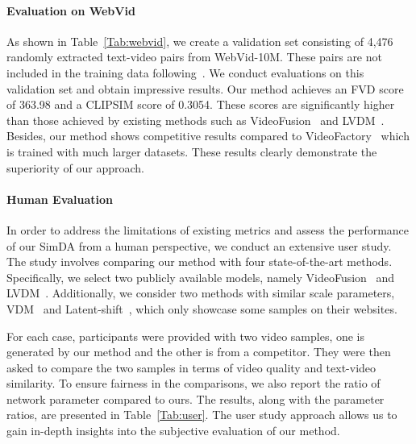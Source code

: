 \paragraph{Evaluation on WebVid}
As shown in Table~\ref{Tab:webvid}, we create a validation set consisting of 4,476 randomly extracted text-video pairs from WebVid-10M. These pairs are not included in the training data following~\cite{videofactory}. We conduct evaluations on this validation set and obtain impressive results. Our method achieves an FVD score of 363.98 and a CLIPSIM score of 0.3054. These scores are significantly higher than those achieved by existing methods such as VideoFusion~\cite{videofusion} and LVDM~\cite{lvdm}. Besides, our method shows competitive results compared to VideoFactory~\cite{videofactory} which is trained with much larger datasets. These results clearly demonstrate the superiority of our approach.

\paragraph{Human Evaluation}
In order to address the limitations of existing metrics and assess the performance of our SimDA from a human perspective, we conduct an extensive user study. The study involves comparing our method with four state-of-the-art methods. Specifically, we select two publicly available models, namely VideoFusion~\cite{videofusion} and LVDM~\cite{lvdm}. Additionally, we consider two methods with similar scale parameters, VDM~\cite{vdm} and Latent-shift~\cite{latentshift}, which only showcase some samples on their websites.

For each case, participants were provided with two video samples, one is generated by our method and the other is from a competitor. They were then asked to compare the two samples in terms of video quality and text-video similarity. To ensure fairness in the comparisons, we also report the ratio of network parameter compared to ours.
The results, along with the parameter ratios, are presented in Table~\ref{Tab:user}. The user study approach allows us to gain in-depth insights into the subjective evaluation of our method.

